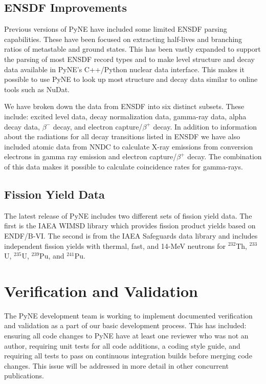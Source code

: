 \documentclass{anstrans}
\begin{document}
\subsection{ENSDF Improvements}

Previous versions of PyNE have included some limited ENSDF parsing capabilities. 
These have been focused on extracting half-lives and branching ratios of 
metastable and ground states. This has been vastly expanded to support the 
parsing of most ENSDF record types and to make level structure and decay data 
available in PyNE's C++/Python nuclear data interface. This makes it possible 
to use PyNE to look up most structure and decay data similar to online tools
such as NuDat. 

We have broken down the data from ENSDF into six distinct subsets. These 
include: excited level data, decay normalization data, gamma-ray data, alpha 
decay data, $\beta^-$ decay, and electron capture/$\beta^+$ decay. In addition 
to information about the radiations for all decay transitions listed in ENSDF we 
have also included atomic data from NNDC to calculate X-ray emissions from 
conversion electrons in gamma ray emission and electron capture/$\beta^+$ decay. %
The combination of this data makes it possible to calculate coincidence rates for
gamma-rays.

\subsection{Fission Yield Data}

The latest release of PyNE includes two different sets of fission yield data. 
The first is the IAEA WIMSD library which provides fission product yields 
based on ENDF/B-VI. The second is from the IAEA Safeguards data library and includes 
independent fission yields with thermal, fast, and 14-MeV neutrons for $^{232}$Th, 
$^{233}$U, $^{235}$U, $^{239}$Pu, and $^{241}$Pu.

\section{Verification and Validation}

The PyNE development team is working to implement documented verification 
and validation as a part of our basic development process. This has included: 
ensuring all code changes to PyNE have at least one reviewer who was not an 
author, requiring unit tests for all code additions, a coding style guide, 
and requiring all tests to pass on continuous integration builds before 
merging code changes. 
This issue will be addressed in more detail in other concurrent publications.
\end{document}
